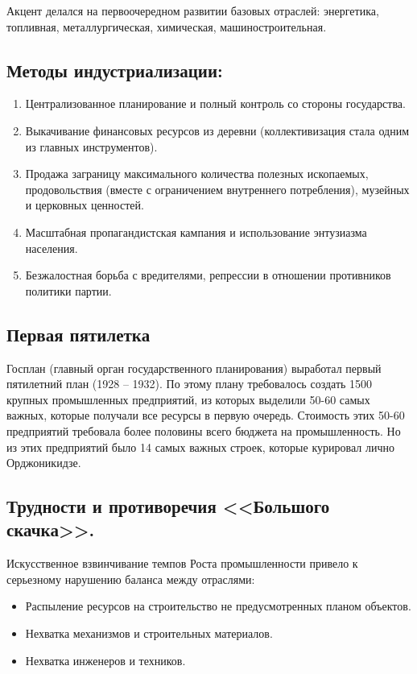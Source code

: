 Акцент делался на первоочередном развитии базовых отраслей: энергетика, топливная, металлургическая, химическая, машиностроительная. 

\subsection{Методы индустриализации:}

\begin{enumerate}
    \item Централизованное планирование и полный контроль со стороны государства.
    \item Выкачивание финансовых ресурсов из деревни (коллективизация стала одним из главных инструментов).
    \item Продажа заграницу максимального количества полезных ископаемых, продовольствия (вместе с ограничением внутреннего потребления), музейных и церковных ценностей.
    \item Масштабная пропагандистская кампания и использование энтузиазма населения.
    \item Безжалостная борьба с вредителями, репрессии в отношении противников политики партии.
\end{enumerate}

\subsection{Первая пятилетка}

Госплан (главный орган государственного планирования) выработал первый пятилетний план (1928 – 1932). По этому плану требовалось создать 1500 крупных промышленных предприятий, из которых выделили 50-60 самых важных, которые получали все ресурсы в первую очередь. Стоимость этих 50-60 предприятий требовала более половины всего бюджета на промышленность. Но из этих предприятий было 14 самых важных строек, которые курировал лично Орджоникидзе.

\subsection{Трудности и противоречия <<Большого скачка>>.}

Искусственное взвинчивание темпов Роста промышленности привело к серьезному нарушению баланса между отраслями:
\begin{itemize}
    \item Распыление ресурсов на строительство не предусмотренных планом объектов.
    \item Нехватка механизмов и строительных материалов.
    \item Нехватка инженеров и техников.
    
\end{itemize}

